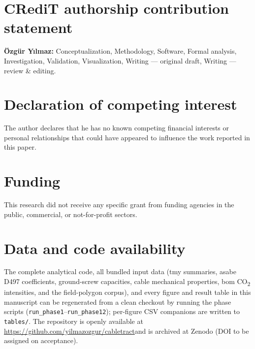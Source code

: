 \documentclass[11pt,a4paper]{article}
\newcommand{\cabletractrepo}{\url{https://github.com/yilmazozgur/cabletract}}
\begin{document}
\section*{CRediT authorship contribution statement}
\textbf{Özgür Yılmaz:} Conceptualization, Methodology, Software, Formal analysis, Investigation, Validation, Visualization, Writing --- original draft, Writing --- review \& editing.

\section*{Declaration of competing interest}
The author declares that he has no known competing financial interests or personal relationships that could have appeared to influence the work reported in this paper.

\section*{Funding}
This research did not receive any specific grant from funding agencies in the public, commercial, or not-for-profit sectors.

\section*{Data and code availability}
The complete analytical code, all bundled input data (\gls{tmy} summaries, \gls{asabe} D497 coefficients, ground-screw capacities, cable mechanical properties, \gls{bom} CO\textsubscript{2} intensities, and the field-polygon corpus), and every figure and result table in this manuscript can be regenerated from a clean checkout by running the phase scripts (\texttt{run\_phase1}--\texttt{run\_phase12}); per-figure CSV companions are written to \texttt{tables/}. The repository is openly available at \cabletractrepo and is archived at Zenodo (DOI to be assigned on acceptance).

\end{document}
